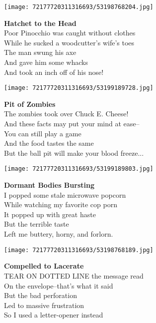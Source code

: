 \documentclass[10pt,letterpaper]{article}
\begin{document}
\begin{center}\texttt{[image: 72177720311316693/53198768204.jpg]}
\end{center}
\begin{center}
\textbf{Hatchet to the Head}\\
\vskip 0.2in
Poor Pinocchio was caught without clothes\\
While he sucked a woodcutter's wife's toes\\
The man swung his axe\\
And gave him some whacks\\
And took an inch off of his nose!\\
\end{center}
\pagebreak

\begin{center}\texttt{[image: 72177720311316693/53199189728.jpg]}
\end{center}
\begin{center}
\textbf{Pit of Zombies}\\
\vskip 0.2in
The zombies took over Chuck E. Cheese!\\
And these facts may put your mind at ease--\\
You can still play a game\\
And the food tastes the same\\
But the ball pit will make your blood freeze...\\
\end{center}
\pagebreak

\begin{center}\texttt{[image: 72177720311316693/53199189803.jpg]}
\end{center}
\begin{center}
\textbf{Dormant Bodies Bursting}\\
\vskip 0.2in
I popped some stale microwave popcorn\\
While watching my favorite cop porn\\
It popped up with great haste\\
But the terrible taste\\
Left me buttery, horny, and forlorn.\\
\end{center}
\pagebreak

\begin{center}\texttt{[image: 72177720311316693/53198768189.jpg]}
\end{center}
\begin{center}
\textbf{Compelled to Lacerate}\\
\vskip 0.2in
TEAR ON DOTTED LINE the message read\\
On the envelope--that's what it said\\
But the bad perforation\\
Led to massive frustration\\
So I used a letter-opener instead\\
\end{center}
\pagebreak
\end{document}
